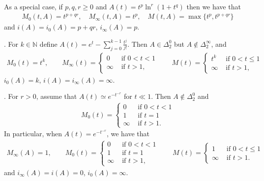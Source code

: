 \documentclass[12pt,reqno]{amsart}
\theoremstyle{definition}
\theoremstyle{remark}
\numberwithin{equation}{section}
\begin{document}
\noindent As a special case, if $p,q,r\geq 0$ and $A(t)=t^p \ln^r (1+t^q)$ then we have that
\begin{align*}
M_0(t,A)=t^{p+qr}, \quad M_\infty(t,A)= t^p, \quad M(t,A)=\max\{t^p, t^{p+qr}\}
\end{align*}
and  $i(A)=i_0(A)=p+qr$, $i_\infty(A)=p$.

\medskip

. For $k\in\mathbb{N}$ define $\displaystyle A(t)=e^t - \sum_{j=0}^{k-1} \frac{t^j}{j!}$. Then $A\in \Delta_2^0$ but $A\notin \Delta_2^\infty$, and
\begin{align*}
M_0(t)=t^k, \qquad 
M_\infty(t)=
\begin{cases}
0 &\text{ if } 0<t<1\\
\infty &\text{ if } t>1,
\end{cases}  \qquad 
M(t)=
\begin{cases}
t^k &\text{ if } 0<t\leq 1\\
\infty &\text{ if } t>1,
\end{cases}
\end{align*}
$i_0(A)= k$, $i(A)=i_\infty(A)=\infty$.

\medskip

. For $r>0$, assume that $A(t)\simeq e^{-t^{-r}}$ for $t\ll1$. Then $A\notin \Delta_2^0$ and 
\begin{align*}
M_0(t)=
\begin{cases}
0 & \text{ if } 0<t<1\\
1 & \text{ if } t=1\\
\infty &\text{ if } t>1.
\end{cases}
\end{align*}
In particular, when $A(t)=e^{-t^{-r}}$,  we have that
\begin{align*}
M_\infty(A)=1, \qquad M_0(t)=
\begin{cases}
0 & \text{ if } 0<t<1\\
1 & \text{ if } t=1\\
\infty &\text{ if } t>1,
\end{cases}
\qquad M(t)=
\begin{cases}
1 & \text{ if } 0<t\leq1\\
\infty &\text{ if } t>1.
\end{cases}
\end{align*}
and
$i_\infty(A)=i(A)=0$, $i_0(A)=\infty$.
\end{document}
